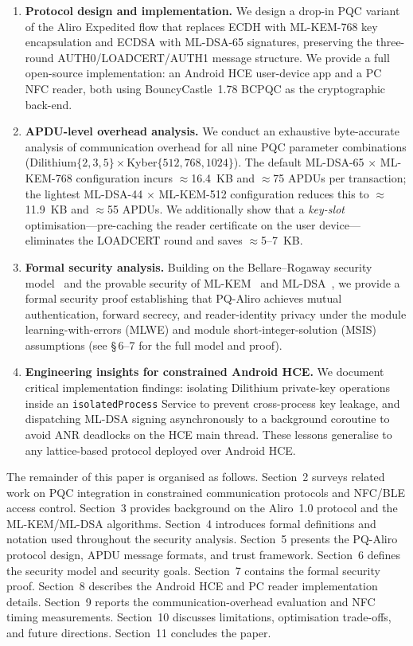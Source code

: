 \begin{enumerate}

\item \textbf{Protocol design and implementation.}
We design a drop-in PQC variant of the Aliro Expedited flow that replaces
ECDH with ML-KEM-768 key encapsulation and ECDSA with ML-DSA-65 signatures,
preserving the three-round AUTH0/LOADCERT/AUTH1 message structure.
We provide a full open-source implementation: an Android HCE user-device app
and a PC NFC reader, both using BouncyCastle~1.78 BCPQC as the cryptographic
back-end.

\item \textbf{APDU-level overhead analysis.}
We conduct an exhaustive byte-accurate analysis of communication overhead for
all nine PQC parameter combinations (Dilithium$\{2,3,5\} \times
$Kyber$\{512,768,1024\}$).
The default ML-DSA-65 $\times$ ML-KEM-768 configuration incurs $\approx$16.4~KB
and $\approx$75 APDUs per transaction; the lightest ML-DSA-44 $\times$
ML-KEM-512 configuration reduces this to $\approx$11.9~KB and $\approx$55
APDUs.
We additionally show that a \emph{key-slot} optimisation---pre-caching the
reader certificate on the user device---eliminates the LOADCERT round and saves
$\approx$5--7~KB.

\item \textbf{Formal security analysis.}
Building on the Bellare--Rogaway security model~\cite{C:BelRog93} and the
provable security of ML-KEM~\cite{EuroSP:BDKLLSSSS18} and
ML-DSA~\cite{TCHES:DKLLSSS18}, we provide a formal security proof establishing
that PQ-Aliro achieves mutual authentication, forward secrecy, and
reader-identity privacy under the module learning-with-errors (MLWE) and
module short-integer-solution (MSIS) assumptions (see §\,6--7 for the full model
and proof).

\item \textbf{Engineering insights for constrained Android HCE.}
We document critical implementation findings: isolating Dilithium private-key
operations inside an \texttt{isolatedProcess} Service to prevent cross-process
key leakage, and dispatching ML-DSA signing asynchronously to a background
coroutine to avoid ANR deadlocks on the HCE main thread.
These lessons generalise to any lattice-based protocol deployed over Android HCE.

\end{enumerate}

\noindent
The remainder of this paper is organised as follows.
Section~2 surveys related work on PQC integration in constrained communication
protocols and NFC/BLE access control.
Section~3 provides background on the Aliro~1.0 protocol and the ML-KEM/ML-DSA
algorithms.
Section~4 introduces formal definitions and notation used throughout the security
analysis.
Section~5 presents the PQ-Aliro protocol design, APDU message formats, and trust
framework.
Section~6 defines the security model and security goals.
Section~7 contains the formal security proof.
Section~8 describes the Android HCE and PC reader implementation details.
Section~9 reports the communication-overhead evaluation and NFC timing
measurements.
Section~10 discusses limitations, optimisation trade-offs, and future directions.
Section~11 concludes the paper.

